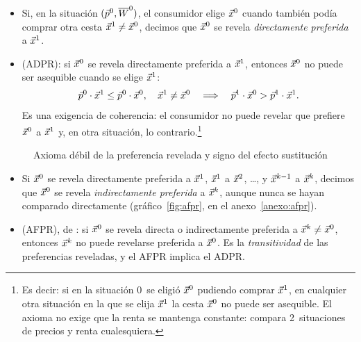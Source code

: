 \documentclass[11pt]{article}
\begin{document}
\begin{itemize}
\item Si, en la situación $(\vec{p}^0,\overline{W}^0)$, el consumidor elige $\vec{x}^0$ cuando también podía comprar otra cesta $\vec{x}^1\neq \vec{x}^0$, decimos que $\vec{x}^0$ se revela \emph{directamente preferida} a $\vec{x}^1$.
\item {} (ADPR): si $\vec{x}^0$ se revela directamente preferida a $\vec{x}^1$, entonces $\vec{x}^0$ no puede ser asequible cuando se elige $\vec{x}^1$:
  \begin{equation}
  \vec{p}^0\cdot \vec{x}^1\leq \vec{p}^0\cdot \vec{x}^0,\quad \vec{x}^1\neq \vec{x}^0\quad\Longrightarrow\quad \vec{p}^1\cdot \vec{x}^0>\vec{p}^1\cdot \vec{x}^1. \label{eq:adpr}
  \end{equation}
  Es una exigencia de coherencia: el consumidor no puede revelar que prefiere $\vec{x}^0$ a $\vec{x}^1$ y, en otra situación, lo contrario.\footnote{Es decir: si en la situación 0~se eligió $\vec{x}^0$ pudiendo comprar $\vec{x}^1$, en cualquier otra situación en la que se elija $\vec{x}^1$ la cesta $\vec{x}^0$ no puede ser asequible. El axioma no exige que la renta se mantenga constante: compara 2~situaciones de precios y renta cualesquiera.}
\end{itemize}

\begin{figure}[H]
\centering
\caption{Axioma débil de la preferencia revelada y signo del efecto sustitución}\label{fig:adpr-efecto-sustitucion}
\end{figure}

\begin{itemize}
\item Si $\vec{x}^0$ se revela directamente preferida a $\vec{x}^1$, $\vec{x}^1$ a $\vec{x}^2$, \dots, y $\vec{x}^{k-1}$ a $\vec{x}^k$, decimos que $\vec{x}^0$ se revela \emph{indirectamente preferida} a $\vec{x}^k$, aunque nunca se hayan comparado directamente (gráfico~\ref{fig:afpr}, en el anexo~\ref{anexo:afpr}).
\item {} (AFPR), de \textcite{Houthakker1950Revealed}: si $\vec{x}^0$ se revela directa o indirectamente preferida a $\vec{x}^k\neq \vec{x}^0$, entonces $\vec{x}^k$ no puede revelarse preferida a $\vec{x}^0$. Es la \emph{transitividad} de las preferencias reveladas, y el AFPR implica el ADPR.
\end{itemize}
\end{document}
